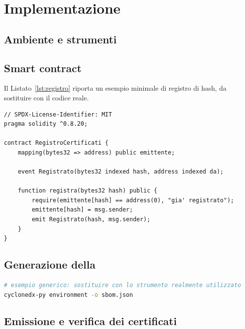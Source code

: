 \chapter{Implementazione}
\label{cap:implementazione}

\section{Ambiente e strumenti}

\section{Smart contract}
Il Listato~\ref{lst:registro} riporta un esempio minimale di registro di hash, da sostituire con il codice reale.

\begin{lstlisting}[language=Solidity, caption={Esempio: registro di hash di certificati e \sbom.}, label={lst:registro}]
// SPDX-License-Identifier: MIT
pragma solidity ^0.8.20;

contract RegistroCertificati {
    mapping(bytes32 => address) public emittente;

    event Registrato(bytes32 indexed hash, address indexed da);

    function registra(bytes32 hash) public {
        require(emittente[hash] == address(0), "gia' registrato");
        emittente[hash] = msg.sender;
        emit Registrato(hash, msg.sender);
    }
}
\end{lstlisting}

\section{Generazione della \sbom}
\begin{lstlisting}[language=bash, caption={Esempio di comando per generare una SBOM.}, label={lst:cmd-sbom}]
# esempio generico: sostituire con lo strumento realmente utilizzato
cyclonedx-py environment -o sbom.json
\end{lstlisting}

\section{Emissione e verifica dei certificati}
